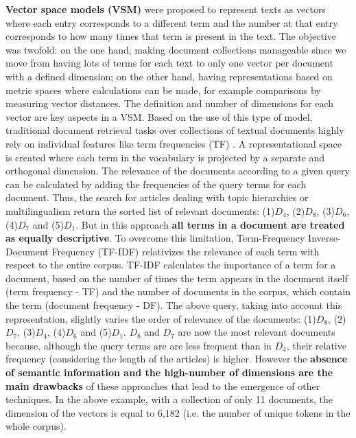 \textbf{Vector space models (VSM)} \citep{Salton1983} were proposed to represent texts as vectors where each entry corresponds to a different term and the number at that entry corresponds to how many times that term is present in the text. The objective was twofold: on the one hand, making document collections manageable since we move from having lots of terms for each text to only one vector per document with a defined dimension; on the other hand, having representations based on metric spaces where calculations can be made, for example comparisons by measuring vector distances. The definition and number of dimensions for each vector are key aspects in a VSM. Based on the use of this type of model, traditional document retrieval tasks over collections of textual documents highly rely on individual features like term frequencies (TF) \citep{Hearst1999}. A representational space is created where each term in the vocabulary is projected by a separate and orthogonal dimension. The relevance of the documents according to a given query can be calculated by adding the frequencies of the query terms for each document. Thus, the search for articles dealing with topic hierarchies or multilingualism return the sorted list of relevant documents: (1)$D_4$, (2)$D_8$, (3)$D_6$, (4)$D_7$ and (5)$D_1$. But in this approach \textbf{all terms in a document are treated as equally descriptive}. To overcome this limitation, Term-Frequency Inverse-Document Frequency (TF-IDF) \citep{lee1995} relativizes the relevance of each term with respect to the entire corpus. TF-IDF calculates the importance of a term for a document, based on the number of times the term appears in the document itself (term frequency - TF) and the number of documents in the corpus, which contain the term (document frequency - DF). The above query, taking into account this representation, slightly varies the order of relevance of the documents: (1)$D_8$, (2)$D_7$, (3)$D_4$, (4)$D_6$ and (5)$D_1$. $D_8$ and $D_7$ are now the most relevant documents because, although the query terms are are less frequent than in $D_4$, their relative frequency (considering the length of the articles) is higher. However the \textbf{absence of semantic information and the high-number of dimensions are the main drawbacks} of these approaches that lead to the emergence of other techniques. In the above example, with a collection of only 11 documents, the dimension of the vectors is equal to 6,182 (i.e. the number of unique tokens in the whole corpus).

